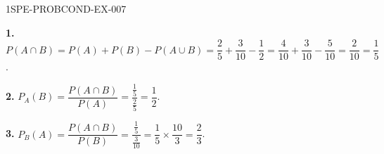 \begin{corrige}{1SPE-PROBCOND-EX-007}

\textbf{1.} $P(A \cap B) = P(A) + P(B) - P(A \cup B) = \dfrac{2}{5} + \dfrac{3}{10} - \dfrac{1}{2} = \dfrac{4}{10} + \dfrac{3}{10} - \dfrac{5}{10} = \dfrac{2}{10} = \dfrac{1}{5}$.

\medskip
\textbf{2.} $P_A(B) = \dfrac{P(A \cap B)}{P(A)} = \dfrac{\frac{1}{5}}{\frac{2}{5}} = \dfrac{1}{2}$.

\medskip
\textbf{3.} $P_B(A) = \dfrac{P(A \cap B)}{P(B)} = \dfrac{\frac{1}{5}}{\frac{3}{10}} = \dfrac{1}{5} \times \dfrac{10}{3} = \dfrac{2}{3}$.

\end{corrige}
